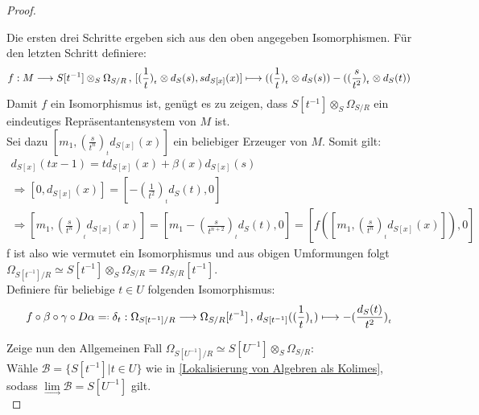 \documentclass[10pt,a4paper]{report}
\newcommand{\comment}[1]{}
\newcommand{\function}[5]{\nolinebreak{#1:#2 \longrightarrow #3 \, , \, #4 \longmapsto #5}}
\newcommand{\divR}[2]{\Omega_{#1/#2}}
\newcommand{\divf}[1]{d_{#1}}
\newcommand{\Tensor}[3]{#1 \otimes_{#2} #3}
\newcommand{\tensor}[3]{#1 \otimes #3}
\newcommand{\lok}[2]{#1 [#2^{-1}]}
\newcommand{\loke}[3]{(\frac{#1}{#2})_{_{#3}}}
\newcommand{\colimes}[0]{\lim\limits_{ \longrightarrow }}
\newcommand*{\defeqr}{= \mathrel{\vcenter{\baselineskip0.5ex \lineskiplimit0pt
                     \hbox{\scriptsize.}\hbox{\scriptsize.}}}}
\begin{document}
\begin{proof}
\begin{itemize}
\begin{center}
\end{center}
Die ersten drei Schritte ergeben sich aus den oben angegeben Isomorphismen. Für den letzten Schritt definiere:
\begin{gather*}
\function{f}{M}{\Tensor{\lok{S}{t}}{S}{\divR{S}{R}}}{[\tensor{\loke{1}{t}{t}}{S}{\divf{S}(s)} , s \divf{S[x]}(x)]}{( \tensor{\loke{1}{t}{t}}{S}{\divf{S}(s)} ) - ( \tensor{\loke{s}{t^2}{t}}{S}{\divf{S}(t)} )}
\end{gather*}
Damit $f$ ein Isomorphismus ist, genügt es zu zeigen, dass $\Tensor{\lok{S}{t}}{S}{\divR{S}{R}}$ ein eindeutiges Repräsentantensystem von $M$ ist.\\
Sei dazu $[m_1,\loke{s}{t^{n}}{t}\divf{S[x]}(x)]$ ein beliebiger Erzeuger von $M$. Somit gilt:
\begin{gather*}
\divf{S[x]}(tx-1) = t\divf{S[x]}(x) + \beta(x)\divf{S[x]}(s)\\
\Rightarrow [0,\divf{S[x]}(x)] = [-\loke{1}{t^2}{t}\divf{S}(t),0]  \\ \comment{\label{\d_S[x] ~ d_S}}
\Rightarrow [m_1,\loke{s}{t^{n}}{t}\divf{S[x]}(x)] = [m_1 - \loke{s}{t^{n + 2}}{t}\divf{S}(t),0] = [f([m_1,\loke{s}{t^{n}}{t}\divf{S[x]}(x)]),0]
\end{gather*}
f ist also wie vermutet ein Isomorphismus und aus obigen Umformungen folgt
$\divR{\lok{S}{t}}{R} \simeq \Tensor{\lok{S}{t}}{S}{\divR{S}{R}} = \lok{\divR{S}{R}}{t}$. \\
Definiere für beliebige $t \in U$ folgenden Isomorphismus:
\begin{gather*}
f \circ \beta \circ \gamma  \circ D\alpha \defeqr \function{\delta_t}{\divR{\lok{S}{t}}{R}}{\lok{\divR{S}{R}}{t}}{\divf{\lok{S}{t}}(\loke{1}{t}{t})}{- \loke{\divf{S}(t)}{t^2}{t}}
\end{gather*}
\end{itemize}
Zeige nun den Allgemeinen Fall $\divR{\lok{S}{U}}{R} \simeq \Tensor{\lok{S}{U}}{S}{\divR{S}{R}}$:\\
Wähle $\mathcal{B} = \lbrace \lok{S}{t} \vert t \in U \rbrace$ wie in \cref{Lokalisierung von Algebren als Kolimes}, sodass $\colimes \mathcal{B} = \lok{S}{U}$ gilt.\\

\end{proof}
\end{document}
